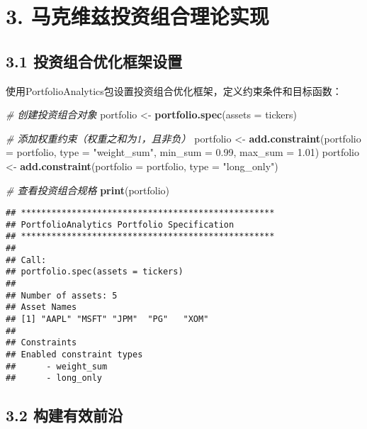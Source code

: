 \documentclass[
]{article}
\newenvironment{Shaded}{\begin{snugshade}}{\end{snugshade}}
\newcommand{\AttributeTok}[1]{\textcolor[rgb]{0.13,0.29,0.53}{#1}}
\newcommand{\CommentTok}[1]{\textcolor[rgb]{0.56,0.35,0.01}{\textit{#1}}}
\newcommand{\FloatTok}[1]{\textcolor[rgb]{0.00,0.00,0.81}{#1}}
\newcommand{\FunctionTok}[1]{\textcolor[rgb]{0.13,0.29,0.53}{\textbf{#1}}}
\newcommand{\NormalTok}[1]{#1}
\newcommand{\OtherTok}[1]{\textcolor[rgb]{0.56,0.35,0.01}{#1}}
\newcommand{\StringTok}[1]{\textcolor[rgb]{0.31,0.60,0.02}{#1}}
\begin{document}
\section{3.
马克维兹投资组合理论实现}\label{ux9a6cux514bux7ef4ux5179ux6295ux8d44ux7ec4ux5408ux7406ux8bbaux5b9eux73b0}

\subsection{3.1
投资组合优化框架设置}\label{ux6295ux8d44ux7ec4ux5408ux4f18ux5316ux6846ux67b6ux8bbeux7f6e}

使用PortfolioAnalytics包设置投资组合优化框架，定义约束条件和目标函数：

\begin{Shaded}
\begin{Highlighting}[]
\CommentTok{\# 创建投资组合对象}
\NormalTok{portfolio }\OtherTok{\textless{}{-}} \FunctionTok{portfolio.spec}\NormalTok{(}\AttributeTok{assets =}\NormalTok{ tickers)}

\CommentTok{\# 添加权重约束（权重之和为1，且非负）}
\NormalTok{portfolio }\OtherTok{\textless{}{-}} \FunctionTok{add.constraint}\NormalTok{(}\AttributeTok{portfolio =}\NormalTok{ portfolio, }\AttributeTok{type =} \StringTok{"weight\_sum"}\NormalTok{, }\AttributeTok{min\_sum =} \FloatTok{0.99}\NormalTok{, }\AttributeTok{max\_sum =} \FloatTok{1.01}\NormalTok{)}
\NormalTok{portfolio }\OtherTok{\textless{}{-}} \FunctionTok{add.constraint}\NormalTok{(}\AttributeTok{portfolio =}\NormalTok{ portfolio, }\AttributeTok{type =} \StringTok{"long\_only"}\NormalTok{)}

\CommentTok{\# 查看投资组合规格}
\FunctionTok{print}\NormalTok{(portfolio)}
\end{Highlighting}
\end{Shaded}

\begin{verbatim}
## **************************************************
## PortfolioAnalytics Portfolio Specification 
## **************************************************
## 
## Call:
## portfolio.spec(assets = tickers)
## 
## Number of assets: 5 
## Asset Names
## [1] "AAPL" "MSFT" "JPM"  "PG"   "XOM" 
## 
## Constraints
## Enabled constraint types
##      - weight_sum 
##      - long_only
\end{verbatim}

\subsection{3.2
构建有效前沿}\label{ux6784ux5efaux6709ux6548ux524dux6cbf}
\end{document}
